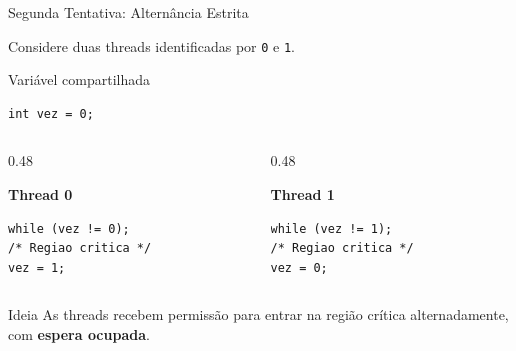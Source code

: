 \documentclass[aspectratio=169,11pt]{beamer}
\begin{document}
\begin{frame}[fragile]{Segunda Tentativa: Alternância Estrita}

Considere duas threads identificadas por
\texttt{0} e \texttt{1}.

\begin{block}{Variável compartilhada}

\begin{verbatim}
int vez = 0;
\end{verbatim}

\end{block}

\begin{columns}[T]

\begin{column}{0.48\textwidth}

\textbf{Thread 0}

\begin{verbatim}
while (vez != 0);
/* Regiao critica */
vez = 1;
\end{verbatim}

\end{column}

\begin{column}{0.48\textwidth}

\textbf{Thread 1}

\begin{verbatim}
while (vez != 1);
/* Regiao critica */
vez = 0;
\end{verbatim}

\end{column}

\end{columns}

\vspace{0.4cm}

\begin{block}{Ideia}
As threads recebem permissão para entrar
na região crítica alternadamente, com \textbf{espera ocupada}.
\end{block}

\end{frame}


\end{document}
